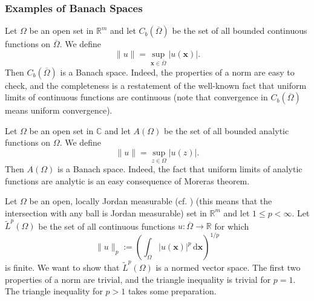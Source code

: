\subsubsection{Examples of Banach Spaces}\label{subsec:banach-space-examples}

\begin{Example}
\label{ex:bounded-continuous-functions-banach}
Let $\Omega$ be an open set in $\mathbb{R}^m$ and let $C_b(\overline\Omega)$ be the set of all bounded continuous functions on $\overline\Omega$. We define
\begin{equation}\label{eq:bounded-continuous-functions-supremum-norm}
\|u\|=\sup_{\bm{x}\in\overline\Omega}|u(\bm{x})|.
\end{equation}
Then $C_b(\overline\Omega)$ is a Banach space. Indeed, the properties of a norm are easy to check, and the completeness is a restatement of the well-known fact that uniform limits of continuous functions are continuous (note that convergence in $C_b(\overline\Omega)$ means uniform convergence).
\end{Example}

\begin{Example}
\label{ex:bounded-analytic-functions-banach}
Let $\Omega$ be an open set in $\mathbb{C}$ and let $A(\Omega)$ be the set of all bounded analytic functions on $\Omega$. We define
\begin{equation}\label{eq:bounded-analytic-functions-supremum-norm}
\|u\|=\sup_{z\in\Omega}|u(z)|.
\end{equation}
Then $A(\Omega)$ is a Banach space. Indeed, the fact that uniform limits of analytic functions are analytic is an easy consequence of Morera\textquotesingle s theorem.
\end{Example}

\begin{Example}
\label{ex:continuous-functions-lp-norm}
Let $\Omega$ be an open, locally Jordan measurable (cf. \cite{Bu}) (this means that the intersection with any ball is Jordan measurable) set in $\mathbb{R}^m$ and let $1\leq p<\infty$. Let $\widetilde L^p(\Omega)$ be the set of all continuous functions $u:\overline\Omega\to\mathbb{R}$ for which
\begin{equation}\label{eq:continuous-functions-lp-integral-norm}
\|u\|_p:=\left(\int_\Omega|u(\bm{x})|^p\,\mathrm{d}\bm{x}\right)^{1/p}
\end{equation}
is finite. We want to show that $\widetilde L^p(\Omega)$ is a normed vector space. The first two properties of a norm are trivial, and the triangle inequality is trivial for $p=1$. The triangle inequality for $p>1$ takes some preparation.
\end{Example}

